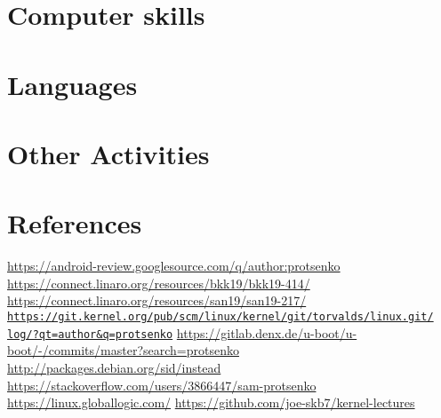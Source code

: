 \documentclass[11pt,a4paper]{moderncv}
\begin{document}
\section{Computer skills}

\pagebreak

\section{Languages}

\section{Other Activities}


\section{References}

\begin{thebibliography}{9}
 {\color{web} \url{https://android-review.googlesource.com/q/author:protsenko}}
 {\color{web} \url{https://connect.linaro.org/resources/bkk19/bkk19-414/}}
 {\color{web} \url{https://connect.linaro.org/resources/san19/san19-217/}}
 {\color{web} \href{https://git.kernel.org/pub/scm/linux/kernel/git/torvalds/linux.git/log/?qt=author&q=protsenko}
                      {\texttt{https://git.kernel.org/pub/scm/linux/kernel/git/torvalds/linux.git/\\log/?qt=author\&q=protsenko}}}
 {\color{web} \url{https://gitlab.denx.de/u-boot/u-boot/-/commits/master?search=protsenko}}
 {\color{web} \url{http://packages.debian.org/sid/instead}}
 {\color{web} \url{https://stackoverflow.com/users/3866447/sam-protsenko}}
 {\color{web} \url{https://linux.globallogic.com/}}
 {\color{web} \url{https://github.com/joe-skb7/kernel-lectures}}
\end{thebibliography}
\end{document}
